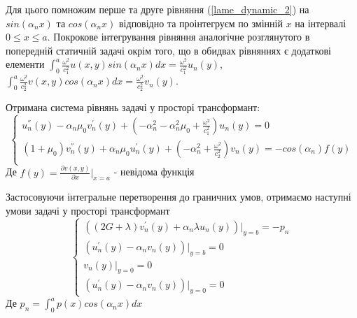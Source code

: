 Для цього помножим перше та друге рівняння (\ref{lame_dynamic_2}) на $sin(\alpha_n x)$ та $cos(\alpha_n x)$ відповідно та проінтегруєм по змінній $x$ на інтервалі $0 \le x \le a$.
Покрокове інтегрування рівняння аналогічне розглянутого в попередній статичній задачі окрім того,
що в обидвах рівняннях є додаткові елементи
$\int_{0}^{a}\frac{\omega^2}{c_1^2}u(x,y)sin(\alpha_n x)dx = \frac{\omega^2}{c_1^2} u_n(y)$,
$\int_{0}^{a}\frac{\omega^2}{c_2^2}v(x,y)cos(\alpha_n x)dx = \frac{\omega^2}{c_2^2} v_n(y)$.

Отримана система рівнянь задачі у просторі трансформант:
\begin{equation}\label{transf_dynamic_2}
    \begin{cases}
        u_n^{''}(y) - \alpha_n \mu_0 v_n^{'}(y) + (-\alpha_n^2 -\alpha_n^2 \mu_0 + \frac{\omega^2}{c_1^2}) u_n(y) = 0 \\
        (1 + \mu_0) v_n^{''}(y) + \alpha_n \mu_0 u_n^{'}(y) + (- \alpha_n^2 + \frac{\omega^2}{c_2^2}) v_n(y) = -cos(\alpha_n) f(y)\\
    \end{cases}
\end{equation}
Де $f(y) = \frac{\partial v(x,y)}{\partial x}|_{x=a}$ - невідома функція

Застосовуючи інтегральне перетворення до граничних умов,
отримаємо наступні умови задачі у просторі трансформант
\begin{equation}\label{transf_bound_dynamic_2}
    \begin{cases}
        \left( (2G + \lambda)v_n^{'}(y) + \alpha_n \lambda u_n(y) \right)|_{y=b} = -p_n \\
        \left(u_n^{'}(y) - \alpha_n v_n(y)  \right)|_{y=b} = 0 \\
        v_n(y)|_{y=0} = 0 \\
        \left(u_n^{'}(y) - \alpha_n v_n(y)  \right)|_{y=0} = 0
    \end{cases}
\end{equation}
Де $p_n = \int_{0}^{a} p(x) cos(\alpha_n x) dx$

